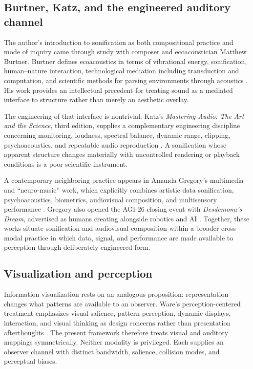 \documentclass[11pt]{article}
\begin{document}
\subsection{Burtner, Katz, and the engineered auditory channel}
The author's introduction to sonification as both compositional practice and mode of inquiry came through study with composer and ecoacoustician Matthew Burtner. Burtner defines ecoacoustics in terms of vibrational energy, sonification, human--nature interaction, technological mediation including transduction and computation, and scientific methods for parsing environments through acoustics \citep{burtnerEcoacoustics}. His work provides an intellectual precedent for treating sound as a mediated interface to structure rather than merely an aesthetic overlay.

The engineering of that interface is nontrivial. Katz's \emph{Mastering Audio: The Art and the Science}, third edition, supplies a complementary engineering discipline concerning monitoring, loudness, spectral balance, dynamic range, clipping, psychoacoustics, and repeatable audio reproduction \citep{katz2015mastering}. A sonification whose apparent structure changes materially with uncontrolled rendering or playback conditions is a poor scientific instrument.

A contemporary neighboring practice appears in Amanda Gregory's multimedia and ``neuro-music'' work, which explicitly combines artistic data sonification, psychoacoustics, biometrics, audiovisual composition, and multisensory performance \citep{gregoryPortfolio,gregoryCreality}. Gregory also opened the AGI-26 closing event with \emph{Desdemona's Dream}, advertised as humans creating alongside robotics and AI \citep{agi26closing}. Together, these works situate sonification and audiovisual composition within a broader cross-modal practice in which data, signal, and performance are made available to perception through deliberately engineered form.

\subsection{Visualization and perception}
Information visualization rests on an analogous proposition: representation changes what patterns are available to an observer. Ware's perception-centered treatment emphasizes visual salience, pattern perception, dynamic displays, interaction, and visual thinking as design concerns rather than presentation afterthoughts \citep{ware2020visualization}. The present framework therefore treats visual and auditory mappings symmetrically. Neither modality is privileged. Each supplies an observer channel with distinct bandwidth, salience, collision modes, and perceptual biases.
\end{document}
